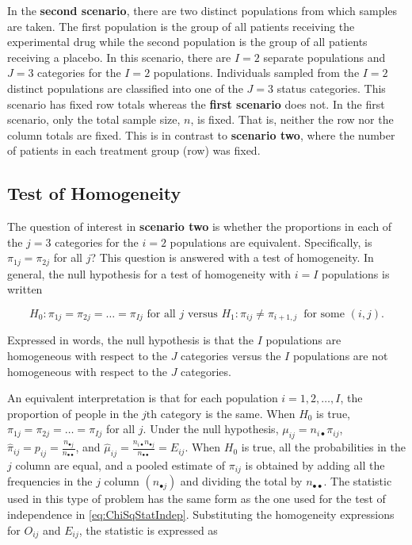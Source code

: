 \documentclass[
]{article}
\begin{document}
In the \textbf{second scenario}, there are two distinct populations from which samples are taken. The first population is the group of all patients receiving the experimental drug while the second population is the group of all patients receiving a placebo. In this scenario, there are \(I=2\) separate populations and \(J=3\) categories for the \(I=2\) populations. Individuals sampled from the \(I=2\) distinct populations are classified into one of the \(J=3\) status categories. This scenario has fixed row totals whereas the \textbf{first scenario} does not. In the first scenario, only the total sample size, \(n\), is fixed. That is, neither the row nor the column totals are fixed. This is in contrast to \textbf{scenario two}, where the number of patients in each treatment group (row) was fixed.

\hypertarget{test-of-homogeneity}{%
\subsection{Test of Homogeneity}\label{test-of-homogeneity}}

The question of interest in \textbf{scenario two} is whether the proportions in each of the \(j=3\) categories for the \(i=2\) populations are equivalent. Specifically, is \(\pi_{1j} = \pi_{2j}\) for all \(j\)? This question is answered with a test of homogeneity. In general, the null hypothesis for a test of homogeneity with \(i=I\) populations is written

\begin{equation}
 H_0: \pi_{1j}=\pi_{2j} = \dots = \pi_{Ij}\text{ for all } j \text{ versus } H_1:
\pi_{ij} \ne \pi_{i+1, j} \: \text{ for some } (i, j).
\end{equation}

Expressed in words, the null hypothesis is that the \(I\) populations are
homogeneous with respect to the \(J\) categories versus the \(I\) populations are not homogeneous with respect to the \(J\) categories.

An equivalent interpretation is that for each population \(i=1,2,\dots, I\), the proportion of people in the \(j\text{th}\) category is the same. When \(H_0\) is true, \(\pi_{1j}=\pi_{2j}=\dots=\pi_{Ij}\) for all \(j\). Under the null hypothesis, \(\mu_{ij}= n_{i\bullet} \pi_{ij}\), \(\hat\pi_{ij}=p_{ij}= \frac{n_{\bullet j}}{n_{\bullet\bullet}}\), and \(\hat{\mu}_{ij}= \frac{n_{i\bullet} n_{\bullet j}}{n_{\bullet\bullet}}=E_{ij}\). When \(H_0\) is true, all the probabilities in the \(j\) column are equal, and a pooled estimate of \(\pi_{ij}\) is obtained by adding all the frequencies in the \(j\) column \((n_{\bullet j})\) and dividing the total by \(n_{\bullet\bullet}\). The statistic used in this type of problem has the same form as the one used for the test of independence in \eqref{eq:ChiSqStatIndep}. Substituting the homogeneity expressions for \(O_{ij}\) and \(E_{ij}\), the statistic is expressed as
\end{document}
